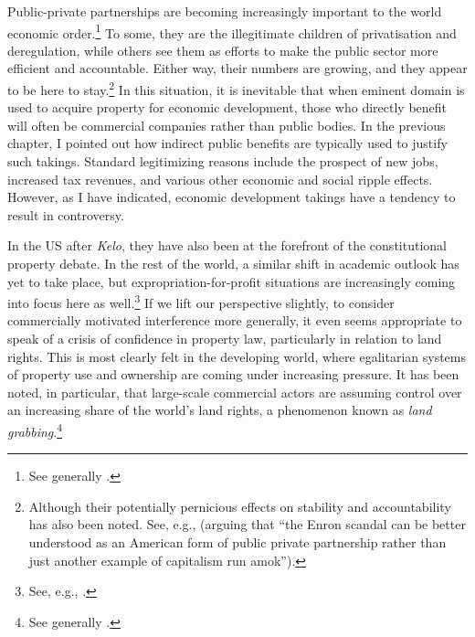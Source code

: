 Public-private partnerships are becoming increasingly important to the world economic order.\footnote{See generally \cite{saussier13}.} To some, they are the illegitimate children of privatisation and deregulation, while others see them as efforts to make the public sector more efficient and accountable. Either way, their numbers are growing, and they appear to be here to stay.\footnote{Although their potentially pernicious effects on stability and accountability has also been noted. See, e.g., \cite{baker03} (arguing that ``the Enron scandal can be better understood as an American form of public private partnership rather than just another example of capitalism run amok'').} In this situation, it is inevitable that when eminent domain is used to acquire property for economic development, those who directly benefit will often be commercial companies rather than public bodies. In the previous chapter, I pointed out how indirect public benefits are typically used to justify such takings. Standard legitimizing reasons include the prospect of new jobs, increased tax revenues, and various other economic and social ripple effects. However, as I have indicated, economic development takings have a tendency to result in controversy.

In the US after {\it Kelo}, they have also been at the forefront of the constitutional property debate. In the rest of the world, a similar shift in academic outlook has yet to take place, but expropriation-for-profit situations are increasingly coming into focus here as well.\footnote{See, e.g., \cite{gray11,waring13,verstappen14}.} If we lift our perspective slightly, to consider commercially motivated interference more generally, it even seems appropriate to speak of a crisis of confidence in property law, particularly in relation to land rights. This is most clearly felt in the developing world, where egalitarian systems of property use and ownership are coming under increasing pressure. It has been noted, in particular, that large-scale commercial actors are assuming control over an increasing share of the world's land rights, a phenomenon known as {\it land grabbing}.\footnote{See generally \cite{borras11}.} 

